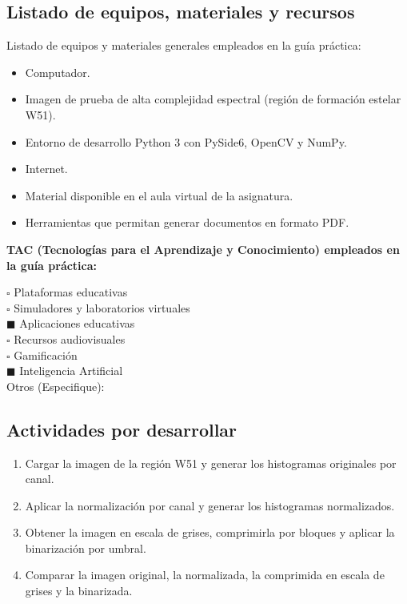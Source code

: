 \documentclass[11pt]{article}
\begin{document}
\subsection{Listado de equipos, materiales y recursos}
Listado de equipos y materiales generales empleados en la guía práctica:
\begin{itemize}
    \item Computador.
    \item Imagen de prueba de alta complejidad espectral (región de formación estelar W51).
    \item Entorno de desarrollo Python 3 con PySide6, OpenCV y NumPy.
    \item Internet.
    \item Material disponible en el aula virtual de la asignatura.
    \item Herramientas que permitan generar documentos en formato PDF.
\end{itemize}

\textbf{TAC (Tecnologías para el Aprendizaje y Conocimiento) empleados en la guía práctica:}

$\square$ Plataformas educativas \\
$\square$ Simuladores y laboratorios virtuales \\
$\blacksquare$ Aplicaciones educativas \\
$\square$ Recursos audiovisuales \\
$\square$ Gamificación \\
$\blacksquare$ Inteligencia Artificial \\
Otros (Especifique): \underline{\hspace{5cm}}

\subsection{Actividades por desarrollar}
\begin{enumerate}
    \item Cargar la imagen de la región W51 y generar los histogramas originales por canal.
    \item Aplicar la normalización por canal y generar los histogramas normalizados.
    \item Obtener la imagen en escala de grises, comprimirla por bloques y aplicar la binarización por umbral.
    \item Comparar la imagen original, la normalizada, la comprimida en escala de grises y la binarizada.
\end{enumerate}
\end{document}
